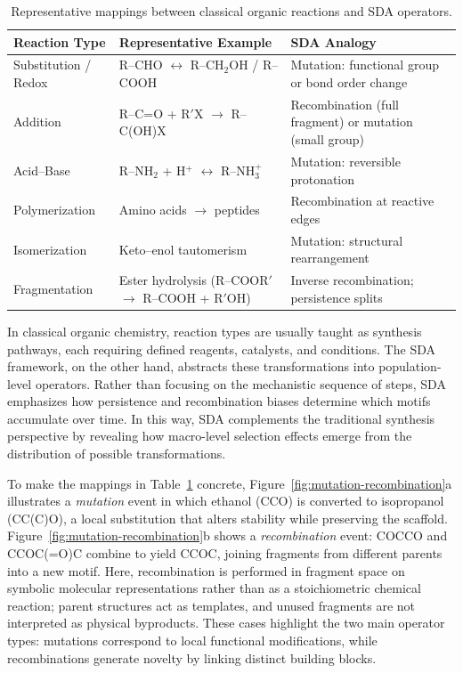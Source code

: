 \documentclass{artificial-life}
\begin{document}
\begin{table}[t]
\caption{Representative mappings between classical organic reactions and SDA operators.}
\label{tab:chem-sda-operators}
\centering
\begin{tabularx}{\textwidth}{l X X}
\toprule
\textbf{Reaction Type} & \textbf{Representative Example} & \textbf{SDA Analogy} \\
\midrule
Substitution / Redox 
& R--CHO $\leftrightarrow$ R--CH$_2$OH / R--COOH 
& Mutation: functional group or bond order change \\

Addition 
& R--C=O + R$'$X $\rightarrow$ R--C(OH)X 
& Recombination (full fragment) or mutation (small group) \\

Acid--Base 
& R--NH$_2$ + H$^+$ $\leftrightarrow$ R--NH$_3^+$ 
& Mutation: reversible protonation \\

Polymerization 
& Amino acids $\rightarrow$ peptides 
& Recombination at reactive edges \\

Isomerization 
& Keto--enol tautomerism 
& Mutation: structural rearrangement \\

Fragmentation 
& Ester hydrolysis (R--COOR$'$ $\rightarrow$ R--COOH + R$'$OH) 
& Inverse recombination; persistence splits \\

\bottomrule
\end{tabularx}
\end{table}


In classical organic chemistry, reaction types are usually taught as synthesis pathways, 
each requiring defined reagents, catalysts, and conditions. The SDA framework, on the other hand, abstracts these transformations into population-level operators. 
Rather than focusing on the mechanistic sequence of steps, SDA emphasizes how
persistence and recombination biases determine which motifs accumulate over time. 
In this way, SDA complements the traditional synthesis perspective by revealing
how macro-level selection effects emerge from the distribution of possible
transformations.  

To make the mappings in Table~\ref{tab:chem-sda-operators} concrete, Figure~\ref{fig:mutation-recombination}a illustrates a \textit{mutation} event in which ethanol (CCO) is converted to isopropanol (CC(C)O), a local substitution that alters stability while preserving the scaffold.
Figure~\ref{fig:mutation-recombination}b shows a \textit{recombination} event: 
COCCO and CCOC(=O)C combine to yield CCOC, joining fragments from different
parents into a new motif. Here, recombination is performed in fragment space on symbolic molecular representations rather than as a stoichiometric chemical reaction; parent structures act as templates, and unused fragments are not interpreted as physical byproducts. These cases highlight the two main operator types:
mutations correspond to local functional modifications, while recombinations
generate novelty by linking distinct building blocks.
\end{document}
